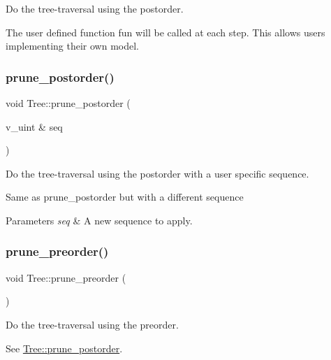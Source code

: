 Do the tree-\/traversal using the postorder. 

The user defined function {\ttfamily fun} will be called at each step. This allows users implementing their own model. \mbox{\label{classTree_a8318027f3d2b1a07bf25e813c7c80056}} 
\subsubsection{\texorpdfstring{prune\+\_\+postorder()}{prune\_postorder()}\hspace{0.1cm}{\footnotesize\ttfamily [2/2]}}
{\footnotesize\ttfamily void Tree\+::prune\+\_\+postorder (\begin{DoxyParamCaption}\item[{v\+\_\+uint \&}]{seq }\end{DoxyParamCaption})\hspace{0.3cm}{\ttfamily [inline]}}



Do the tree-\/traversal using the postorder with a user specific sequence. 

Same as {\ttfamily prune\+\_\+postorder} but with a different sequence 
\begin{DoxyParams}{Parameters}
{\em seq} & A new sequence to apply. \\
\hline
\end{DoxyParams}
\mbox{\label{classTree_ac85bfb083b3856e65987e1d15885a61c}} 
\subsubsection{\texorpdfstring{prune\+\_\+preorder()}{prune\_preorder()}\hspace{0.1cm}{\footnotesize\ttfamily [1/2]}}
{\footnotesize\ttfamily void Tree\+::prune\+\_\+preorder (\begin{DoxyParamCaption}{ }\end{DoxyParamCaption})\hspace{0.3cm}{\ttfamily [inline]}}



Do the tree-\/traversal using the preorder. 

See \hyperlink{classTree_a7d465880d18acf79f3a772ea5412b0d7}{Tree\+::prune\+\_\+postorder}. \mbox{\label{classTree_a6841109c7ff37bcabdf3a4d79009ad21}} 

